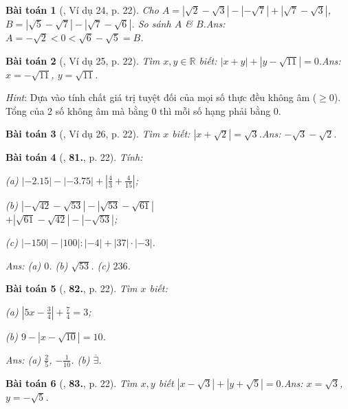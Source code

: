 \documentclass{article}
\numberwithin{equation}{section}
\newtheorem{baitoan}{Bài toán}
\begin{document}
\begin{baitoan}[\cite{Tuyen_Toan_7}, Ví dụ 24, p. 22]
	Cho $A = |\sqrt{2} - \sqrt{3}| - |-\sqrt{7}| + |\sqrt{7} - \sqrt{3}|$, $B = |\sqrt{5} - \sqrt{7}| - |\sqrt{7} - \sqrt{6}|$. So sánh $A$ \& $B$.\hfill\textsf{Ans:} $A = -\sqrt{2} < 0 < \sqrt{6} - \sqrt{5} = B$.
\end{baitoan}	

\begin{baitoan}[\cite{Tuyen_Toan_7}, Ví dụ 25, p. 22]
	Tìm $x,y\in\mathbb{R}$ biết: $|x + y| + |y - \sqrt{11}| = 0$.\hfill\textsf{Ans:} $x = -\sqrt{11}$, $y = \sqrt{11}$.
\end{baitoan}
\noindent\textit{Hint}: Dựa vào tính chất giá trị tuyệt đối của mọi số thực đều không âm ($\ge 0$). Tổng của 2 số không âm mà bằng $0$ thì mỗi số hạng phải bằng $0$.

\begin{baitoan}[\cite{Tuyen_Toan_7}, Ví dụ 26, p. 22]
	Tìm $x$ biết: $|x + \sqrt{2}| = \sqrt{3}$.\hfill\textsf{Ans:} $-\sqrt{3} - \sqrt{2}$.
\end{baitoan}

\begin{baitoan}[\cite{Tuyen_Toan_7}, \textbf{81.}, p. 22]
	Tính:
	\begin{enumerate*}
		\item[(a)] $|-2.15| - |-3.75| + \left|\frac{4}{3} + \frac{4}{15}\right|$;
		\item[(b)] $|-\sqrt{42} - \sqrt{53}| - |\sqrt{53} - \sqrt{61}|$\\$+ |\sqrt{61} - \sqrt{42}| - |-\sqrt{53}|$;
		\item[(c)] $|-150| - |100|:|-4| + |37|\cdot|-3|$.
	\end{enumerate*}\hfill\textsf{Ans:} (a) $0$. (b) $\sqrt{53}$. (c) $236$.
\end{baitoan}

\begin{baitoan}[\cite{Tuyen_Toan_7}, \textbf{82.}, p. 22]
	Tìm $x$ biết:
	\begin{enumerate*}
		\item[(a)] $\left|5x - \frac{3}{4}\right| + \frac{7}{4} = 3$;
		\item[(b)] $9 - |x - \sqrt{10}| = 10$.
	\end{enumerate*}\hfill\textsf{Ans:} (a) $\frac{2}{5}$, $-\frac{1}{10}$. (b) $\overline{\exists}$.
\end{baitoan}

\begin{baitoan}[\cite{Tuyen_Toan_7}, \textbf{83.}, p. 22]
	Tìm $x,y$ biết $|x - \sqrt{3}| + |y + \sqrt{5}| = 0$.\hfill\textsf{Ans:} $x = \sqrt{3}$, $y = -\sqrt{5}$.
\end{baitoan}
\end{document}
